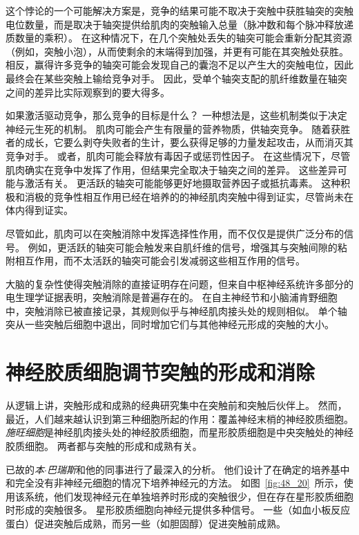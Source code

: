 这个悖论的一个可能解决方案是，竞争的结果可能不取决于突触中获胜轴突的突触电位数量，而是取决于轴突提供给肌肉的突触输入总量（脉冲数和每个脉冲释放递质数量的乘积）。
在这种情况下，在几个突触处丢失的轴突可能会重新分配其资源（例如，突触小泡），从而使剩余的末端得到加强，并更有可能在其突触处获胜。
相反，赢得许多竞争的轴突可能会发现自己的囊泡不足以产生大的突触电位，因此最终会在某些突触上输给竞争对手。
因此，受单个轴突支配的肌纤维数量在轴突之间的差异比实际观察到的要大得多。


如果激活驱动竞争，那么竞争的目标是什么？
一种想法是，这些机制类似于决定神经元生死的机制。
肌肉可能会产生有限量的营养物质，供轴突竞争。
随着获胜者的成长，它要么剥夺失败者的生计，要么获得足够的力量发起攻击，从而消灭其竞争对手。
或者，肌肉可能会释放有毒因子或惩罚性因子。
在这些情况下，尽管肌肉确实在竞争中发挥了作用，但结果完全取决于轴突之间的差异。
这些差异可能与激活有关。
更活跃的轴突可能能够更好地摄取营养因子或抵抗毒素。
这种积极和消极的竞争性相互作用已经在培养的的神经肌肉突触中得到证实，尽管尚未在体内得到证实。


尽管如此，肌肉可以在突触消除中发挥选择性作用，而不仅仅是提供广泛分布的信号。
例如，更活跃的轴突可能会触发来自肌纤维的信号，增强其与突触间隙的粘附相互作用，而不太活跃的轴突可能会引发减弱这些相互作用的信号。


大脑的复杂性使得突触消除的直接证明存在问题，但来自中枢神经系统许多部分的电生理学证据表明，突触消除是普遍存在的。
在自主神经节和小脑浦肯野细胞中，突触消除已被直接记录，其规则似乎与神经肌肉接头处的规则相似。
单个轴突从一些突触后细胞中退出，同时增加它们与其他神经元形成的突触的大小。



\section{神经胶质细胞调节突触的形成和消除}

从逻辑上讲，突触形成和成熟的经典研究集中在突触前和突触后伙伴上。
然而，最近，人们越来越认识到第三种细胞所起的作用：覆盖神经末梢的神经胶质细胞。
\textit{施旺细胞}是神经肌肉接头处的神经胶质细胞，而星形胶质细胞是中央突触处的神经胶质细胞。
两者都与突触的形成和成熟有关。


已故的\textit{本$\cdot$巴瑞斯}和他的同事进行了最深入的分析。
他们设计了在确定的培养基中和完全没有非神经元细胞的情况下培养神经元的方法。
如图~\ref{fig:48_20}~所示，使用该系统，他们发现神经元在单独培养时形成的突触很少，但在存在星形胶质细胞时形成的突触很多。
星形胶质细胞向神经元提供多种信号。
一些（如血小板反应蛋白）促进突触后成熟，而另一些（如胆固醇）促进突触前成熟。


